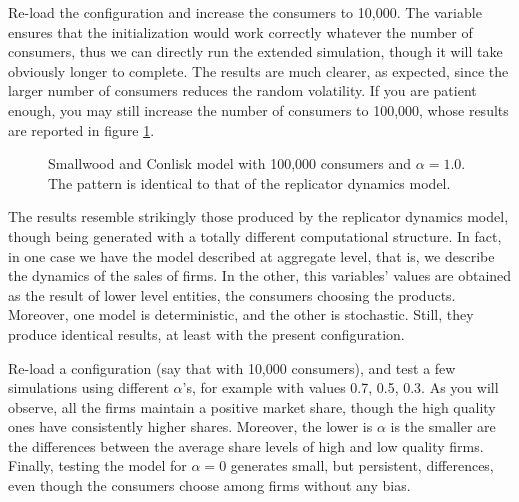 \documentclass [11pt,a4paper] {book}
\begin{document}
Re-load the configuration and increase the consumers to 10,000. The  variable ensures that the initialization would work correctly whatever the number of consumers, thus we can directly run the extended simulation, though it will take obviously longer to complete. The results are much clearer, as expected, since the larger number of consumers reduces the random volatility. If you are patient enough, you may still increase the number of consumers to 100,000, whose results are reported in figure \ref{fig:sc}.

\begin{figure}[ht]
  \centering
  \caption{\small Smallwood and Conlisk model with 100,000 consumers and $\alpha=1.0$. The pattern is identical to that of the replicator dynamics model.}
   \label{fig:sc}
\end{figure}

The results resemble strikingly those produced by the replicator dynamics model, though being generated with a totally different computational structure. In fact, in one case we have the model described at aggregate level, that is, we describe the dynamics of the sales of firms. In the other, this variables' values are obtained as the result of lower level entities, the consumers choosing the products. Moreover, one model is deterministic, and the other is stochastic. Still, they produce identical results, at least with the present configuration.

Re-load a configuration (say that with 10,000 consumers), and test a few simulations using different $\alpha$'s, for example with values 0.7, 0.5, 0.3. As you will observe, all the firms maintain a positive market share, though the high quality ones have consistently higher shares. Moreover, the lower is $\alpha$ is the smaller are the differences between the average share levels of high and low quality firms. Finally, testing the model for $\alpha=0$ generates small, but persistent, differences, even though the consumers choose among firms without any bias.
\end{document}
